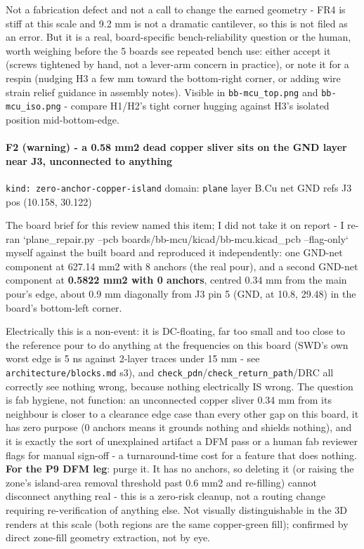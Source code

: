 \documentclass[11pt,a4paper]{article}
\begin{document}
Not a fabrication defect and not a call to change the earned geometry - FR4 is stiff at this scale and 9.2 mm is not a dramatic cantilever, so this is not filed as an error. But it is a real, board-specific bench-reliability question or the human, worth weighing before the 5 boards see repeated bench use: either accept it (screws tightened by hand, not a lever-arm concern in practice), or note it for a respin (nudging H3 a few mm toward the bottom-right corner, or adding wire strain relief guidance in assembly notes). Visible in \texttt{bb-mcu\_top.png} and \texttt{bb-mcu\_iso.png} - compare H1/H2's tight corner hugging against H3's isolated position mid-bottom-edge.

\paragraph*{F2 (warning) - a 0.58 mm2 dead copper sliver sits on the GND layer near J3, unconnected to anything}
\texttt{kind: zero-anchor-copper-island} \textbar{} domain: \texttt{plane} \textbar{} layer B.Cu \textbar{} net GND \textbar{} refs J3 \textbar{} pos (10.158, 30.122)

The board brief for this review named this item; I did not take it on report - I re-ran `plane\_repair.py --pcb boards/bb-mcu/kicad/bb-mcu.kicad\_pcb --flag-only` myself against the built board and reproduced it independently: one GND-net component at 627.14 mm2 with 8 anchors (the real pour), and a second GND-net component at \textbf{0.5822 mm2 with 0 anchors}, centred 0.34 mm from the main pour's edge, about 0.9 mm diagonally from J3 pin 5 (GND, at 10.8, 29.48) in the board's bottom-left corner.

Electrically this is a non-event: it is DC-floating, far too small and too close to the reference pour to do anything at the frequencies on this board (SWD's own worst edge is 5 ns against 2-layer traces under 15 mm - see \texttt{architecture/blocks.md} s3), and \texttt{check\_pdn}/\texttt{check\_return\_path}/DRC all correctly see nothing wrong, because nothing electrically IS wrong. The question is fab hygiene, not function: an unconnected copper sliver 0.34 mm from its neighbour is closer to a clearance edge case than every other gap on this board, it has zero purpose (0 anchors means it grounds nothing and shields nothing), and it is exactly the sort of unexplained artifact a DFM pass or a human fab reviewer flags for manual sign-off - a turnaround-time cost for a feature that does nothing. \textbf{For the P9 DFM leg}: purge it. It has no anchors, so deleting it (or raising the zone's island-area removal threshold past 0.6 mm2 and re-filling) cannot disconnect anything real - this is a zero-risk cleanup, not a routing change requiring re-verification of anything else. Not visually distinguishable in the 3D renders at this scale (both regions are the same copper-green fill); confirmed by direct zone-fill geometry extraction, not by eye.
\end{document}
